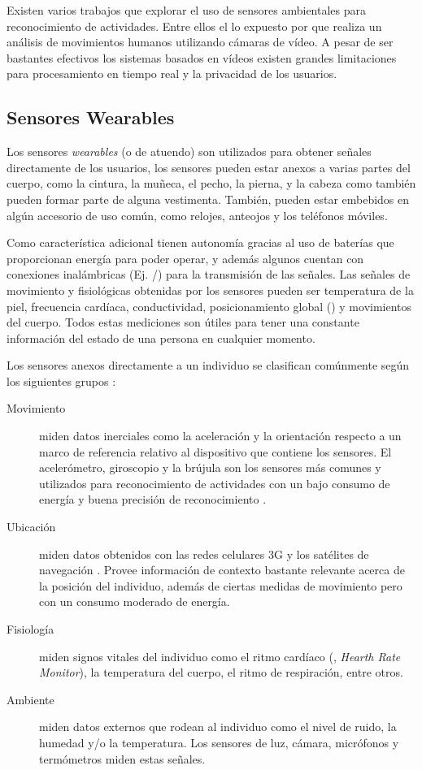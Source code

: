Existen varios trabajos que explorar el uso de sensores ambientales
para reconocimiento de actividades. Entre ellos el lo expuesto por
\cite{Poppe2007} que realiza un análisis de movimientos humanos utilizando
cámaras de vídeo. A pesar de ser bastantes efectivos los sistemas
basados en vídeos existen grandes limitaciones para procesamiento
en tiempo real y la privacidad de los usuarios.

\subsection{Sensores Wearables}

Los sensores \emph{wearables} (o de atuendo) son utilizados para obtener
señales directamente de los usuarios, los sensores pueden estar anexos
a varias partes del cuerpo, como la cintura, la muñeca, el pecho,
la pierna, y la cabeza \cite{Bao2004} como también pueden formar
parte de alguna vestimenta. También, pueden estar embebidos en algún
accesorio de uso común, como relojes, anteojos y los teléfonos móviles. 

Como característica adicional tienen autonomía gracias al uso de baterías
que proporcionan energía para poder operar, y además algunos cuentan
con conexiones inalámbricas (Ej. /) para
la transmisión de las señales. Las señales de movimiento y fisiológicas
obtenidas por los sensores pueden ser temperatura de la piel, frecuencia
cardíaca, conductividad, posicionamiento global () y movimientos
del cuerpo. Todos estas mediciones son útiles para tener una constante
información del estado de una persona en cualquier momento.

Los sensores anexos directamente a un individuo se clasifican comúnmente
según los siguientes grupos \cite{LaraLabrador2013}:
\begin{description}
\item [{Movimiento}] miden datos inerciales como la aceleración y la orientación
respecto a un marco de referencia relativo al dispositivo que contiene
los sensores. El acelerómetro, giroscopio y la brújula son los sensores
más comunes y utilizados para reconocimiento de actividades con un
bajo consumo de energía y buena precisión de reconocimiento \cite{Bao2004,LaraLabrador2012}.
\item [{Ubicación}] miden datos obtenidos con las redes celulares 3G y
los satélites de navegación . Provee información de contexto
bastante relevante acerca de la posición del individuo, además de
ciertas medidas de movimiento pero con un consumo moderado de energía.
\item [{Fisiología}] miden signos vitales del individuo como el ritmo cardíaco
(, \emph{Hearth Rate Monitor}), la temperatura del cuerpo,
el ritmo de respiración, entre otros.
\item [{Ambiente}] miden datos externos que rodean al individuo como el
nivel de ruido, la humedad y/o la temperatura. Los sensores de luz,
cámara, micrófonos y termómetros miden estas señales. 
\end{description}


